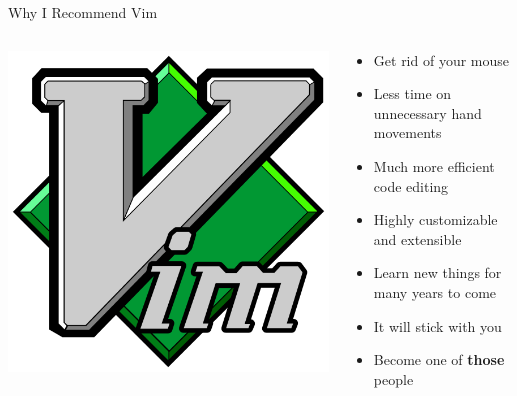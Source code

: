 \documentclass{beamer}
\begin{document}
\usebackgroundtemplate{}
\begin{frame}{Why I Recommend Vim}
    \begin{columns}
        \begin{column}{0.4\textwidth}
            \begin{center}
                \includegraphics[width=1\textwidth]{images/vim-logo.png}
            \end{center}
        \end{column}
        \begin{column}{0.6\textwidth}
            \begin{itemize}
                \item Get rid of your mouse
                \item Less time on unnecessary hand movements
                \item Much more efficient code editing
                \item Highly customizable and extensible
                \item Learn new things for many years to come
                \item It will stick with you
                \item Become one of \textbf{those} people
            \end{itemize}
        \end{column}
    \end{columns}
\end{frame}
\end{document}
